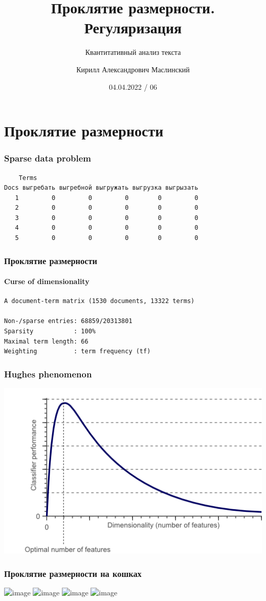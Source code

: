 \documentclass[svgnames]{beamer}
\title[QTA 06] %
{Проклятие размерности. Регуляризация}
\subtitle
{Квантитативный анализ текста} %
\author%
{Кирилл Александрович Маслинский}
\institute%
{НИУ ВШЭ Санкт-Петербург}
\date%
{04.04.2022 / 06}
\begin{document}
\begin{frame}
  \titlepage
\end{frame}

\section{Проклятие размерности}

\begin{frame}[fragile]
  \frametitle{Sparse data problem}
\begin{verbatim}
    Terms
Docs выгребать выгребной выгружать выгрузка выгрызать
   1         0         0         0        0         0
   2         0         0         0        0         0
   3         0         0         0        0         0
   4         0         0         0        0         0
   5         0         0         0        0         0
\end{verbatim}
\end{frame}

\begin{frame}[fragile]
  \frametitle{Проклятие размерности}
  \framesubtitle{Curse of dimensionality}
\begin{verbatim}
A document-term matrix (1530 documents, 13322 terms)

Non-/sparse entries: 68859/20313801
Sparsity           : 100%
Maximal term length: 66 
Weighting          : term frequency (tf)
\end{verbatim}
\end{frame}

\begin{frame}
  \frametitle{Hughes phenomenon}
  \centering
  \includegraphics[width=.9\textwidth]{dimensionality_vs_performance}
\end{frame}

\begin{frame}
  \frametitle{Проклятие размерности на кошках}
  \centering
  \includegraphics<1>[width=.6\textwidth]{1Dproblem}
  \includegraphics<2>[width=.6\textwidth]{2Dproblem}
  \includegraphics<3>[width=.6\textwidth]{3Dproblem}
  \includegraphics<4>[width=.6\textwidth]{3Dproblem_separated}
\end{frame}
\end{document}
